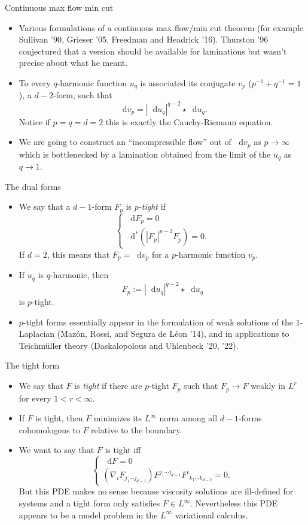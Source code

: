 \documentclass[10pt]{beamer}
\newcommand*\dif{\mathop{}\!\mathrm{d}}
\begin{document}
\begin{frame}{Continuous max flow min cut}
\begin{itemize}
\item Various formulations of a continuous max flow/min cut theorem (for example Sullivan '90, Grieser '05, Freedman and Headrick '16). Thurston '96 conjectured that a version should be available for laminations but wasn't precise about what he meant. \pause
\item To every $q$-harmonic function $u_q$ is associated its conjugate $v_p$ ($p^{-1} + q^{-1} = 1$), a $d - 2$-form, such that
$$\dif v_p = |\dif u_q|^{q - 2} \star \dif u_q.$$
Notice if $p = q = d = 2$ this is exactly the Cauchy-Riemann equation. \pause
\item We are going to construct an ``incompressible flow'' out of $\dif v_p$ as $p \to \infty$ which is bottlenecked by a lamination obtained from the limit of the $u_q$ as $q \to 1$.
\end{itemize}
\end{frame}

\begin{frame}{The dual forms}
\begin{itemize}
\item We say that a $d - 1$-form $F_p$ is \emph{$p$-tight} if
$$\begin{cases}
\dif F_p = 0 \\
\dif^* (|F_p|^{p - 2} F_p) = 0.
\end{cases}$$
If $d = 2$, this means that $F_p = \dif v_p$ for a $p$-harmonic function $v_p$. \pause
\item If $u_q$ is $q$-harmonic, then
$$F_p := |\dif u_q|^{q - 2} \star \dif u_q$$
is $p$-tight.
\item $p$-tight forms essentially appear in the formulation of weak solutions of the $1$-Laplacian (Maz\'on, Rossi, and Segura de L\'eon '14), and in applications to Teichm\"uller theory (Daskalopolous and Uhlenbeck '20, '22).
\end{itemize}
\end{frame}

\begin{frame}{The tight form}
\begin{itemize}
\item We say that $F$ is \emph{tight} if there are $p$-tight $F_p$ such that $F_p \to F$ weakly in $L^r$ for every $1 < r < \infty$. \pause
\item If $F$ is tight, then $F$ minimizes its $L^\infty$ norm among all $d - 1$-forms cohomologous to $F$ relative to the boundary. \pause
\item We want to say that $F$ is tight iff
$$\begin{cases}
\dif F = 0 \\
(\nabla_i F_{j_1 \cdots j_{d - 1}}) F^{j_1 \cdots j_{d - 1}} {F^i}_{k_1 \cdots k_{d - 2}} = 0.
\end{cases}$$
But this PDE makes no sense because viscosity solutions are ill-defined for systems and a tight form only satisfies $F \in L^\infty$.
Nevertheless this PDE appears to be a model problem in the $L^\infty$ variational calculus.
\end{itemize}
\end{frame}
\end{document}

